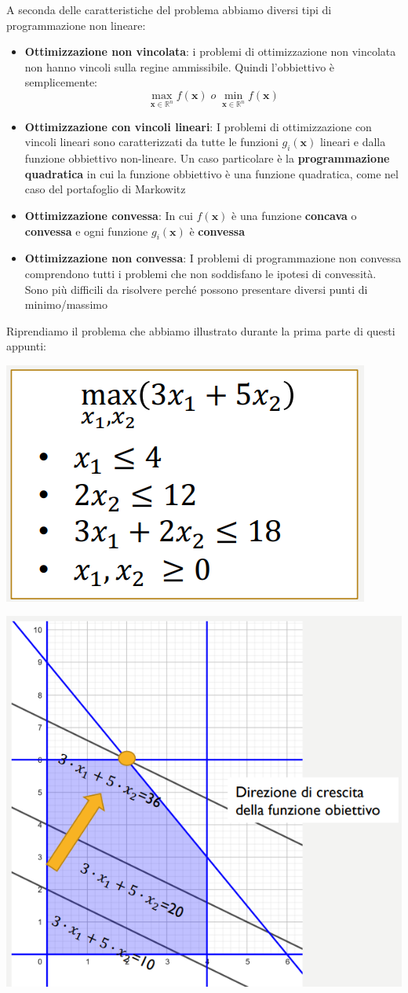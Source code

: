 \documentclass[12pt]{article}
\begin{document}
A seconda delle caratteristiche del problema abbiamo diversi tipi di programmazione non lineare:
\begin{itemize}
    \item \textbf{Ottimizzazione non vincolata}: i problemi di ottimizzazione non vincolata non hanno vincoli sulla regine ammissibile. Quindi l'obbiettivo è semplicemente:
    $$\max_{\boldsymbol{x} \in \mathbb{R}^n}{f(\boldsymbol{x})} \; o \; \min_{\boldsymbol{x} \in \mathbb{R}^n}{f(\boldsymbol{x})}$$
    \item \textbf{Ottimizzazione con vincoli lineari}: I problemi di ottimizzazione con vincoli lineari sono caratterizzati da tutte le funzioni $g_i(\boldsymbol{x})$ lineari e dalla funzione obbiettivo non-lineare.
    Un caso particolare è la \textbf{programmazione quadratica} in cui la funzione obbiettivo è una funzione quadratica, come nel caso del portafoglio di Markowitz
    \item \textbf{Ottimizzazione convessa}: In cui $f(\boldsymbol{x})$ è una funzione \textbf{concava} o \textbf{convessa} e ogni funzione $g_i(\boldsymbol{x})$ è \textbf{convessa}
    \item \textbf{Ottimizzazione non convessa}: I problemi di programmazione non convessa comprendono tutti i problemi che non soddisfano le ipotesi di convessità. Sono più difficili da risolvere perché possono presentare diversi punti di minimo/massimo
\end{itemize}
Riprendiamo il problema che abbiamo illustrato durante la prima parte di questi appunti:
\begin{center}
    \includegraphics[width = 0.35\linewidth]{Images/83.png}
\end{center}
\begin{center}
    \includegraphics[width = 0.45\linewidth]{Images/84.png}
\end{center}
\end{document}
